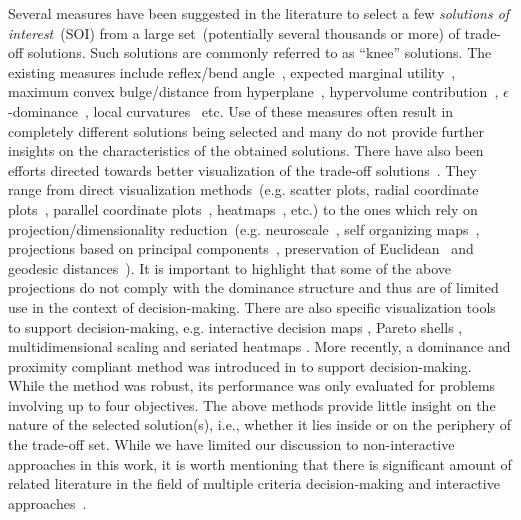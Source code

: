 Several measures have been suggested in the literature to select a few \emph{solutions of interest}~(SOI) from a large set~(potentially several thousands or more) of trade-off solutions. Such solutions are commonly referred to as ``knee'' solutions. The existing measures include reflex/bend angle~\cite{deb2011understanding}, expected marginal utility~\cite{branke2004finding}, maximum convex bulge/distance from hyperplane~\cite{das_characterizing_1999}, hypervolume contribution~\cite{zhang_knee_2014}, $\epsilon$-dominance~\cite{zitzler2004tutorial}, local curvatures~\cite{bhattacharjee2016soi} etc. Use of these measures often result in completely different solutions being selected and many do not provide further insights on the characteristics of the obtained solutions. There have also been efforts directed towards better visualization of the trade-off solutions~\cite{tusar2015visualization}. They range from direct visualization methods~(e.g. scatter plots, radial coordinate plots~\cite{hoffman1997rad}, parallel coordinate plots~\cite{inselberg1991parallel}, heatmaps~\cite{pryke2007heatmap}, etc.) to the ones which rely on projection/dimensionality reduction~(e.g. neuroscale~\cite{lowe1996feed}, self organizing maps~\cite{kohonen1998self}, projections based on principal components~\cite{masafumi2010study}, preservation of Euclidean~\cite{sammon1969nonlinear} and geodesic distances~\cite{tenenbaum2000global}). It is important to highlight that some of the above projections do not comply with the dominance structure and thus are of limited use in the context of decision-making. There are also specific visualization tools to support decision-making, e.g. interactive decision maps \cite{lotov2013interactive}, Pareto shells \cite{walker2010visualisation}, multidimensional scaling \cite{borg2005modern} and seriated heatmaps \cite{walker2013visualizing}. More recently, a dominance and proximity compliant method was introduced in \cite{tusar2015visualization} to support decision-making. While the method was robust, its performance was only evaluated for problems involving up to four objectives. The above methods provide little insight on the nature of the selected solution(s), i.e., whether it lies inside or on the periphery of the trade-off set. While we have limited our discussion to non-interactive approaches in this work, it is worth mentioning that there is significant amount of related literature in the field of multiple criteria decision-making and interactive approaches~\cite{miettinen1999,debmcdm2008,takagiiEMO2001,chandeci1983}.

